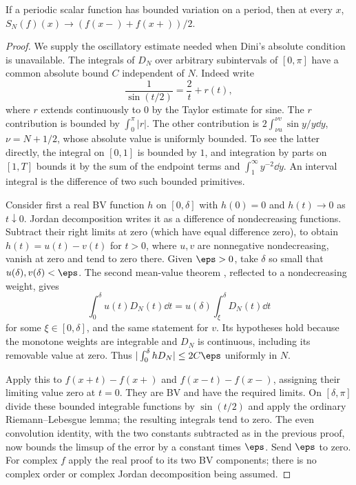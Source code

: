 \begin{theorem}
If a periodic scalar function has bounded variation on a period, then at
every $x$,
$S_N(f)(x)\to(f(x-)+f(x+))/2$.
\end{theorem}
\begin{proof}
We supply the oscillatory estimate needed when Dini's absolute condition
is unavailable. The integrals of $D_N$ over arbitrary subintervals of
$[0,\pi]$ have a common absolute bound $C$ independent of $N$.
Indeed write
\[
 \frac1{\sin(t/2)}=\frac2t+r(t),
\]
where $r$ extends continuously to $0$ by the Taylor estimate for sine.
The $r$ contribution is bounded by $\int_0^\pi|r|$. The other contribution
is $2\int_{\nu u}^{\nu v}\sin y/y\dd y$, $\nu=N+1/2$, whose absolute
value is uniformly bounded. To see the latter directly, the integral on
$[0,1]$ is bounded by $1$, and integration by parts on $[1,T]$ bounds
it by the sum of the endpoint terms and $\int_1^\infty y^{-2}\dd y$.
An interval integral is the difference of two such bounded primitives.

Consider first a real BV function $h$ on $[0,\delta]$ with $h(0)=0$ and
$h(t)\to0$ as $t\downarrow0$. Jordan decomposition writes it as a
difference of nondecreasing functions. Subtract their right limits at zero
(which have equal difference zero), to obtain
$h(t)=u(t)-v(t)$ for $t>0$, where $u,v$ are nonnegative nondecreasing,
vanish at zero and tend to zero there. Given $\eps>0$, take $\delta$ so
small that $u(\delta),v(\delta)<\eps$.
The second mean-value theorem , reflected to a nondecreasing
weight, gives
\[
 \int_0^\delta u(t)D_N(t)\dd t
       =u(\delta)\int_\xi^\delta D_N(t)\dd t
\]
for some $\xi\in[0,\delta]$, and the same statement for $v$.
Its hypotheses hold because the monotone weights are integrable and
$D_N$ is continuous, including its removable value at zero. Thus
$|\int_0^\delta hD_N|\leq2C\eps$ uniformly in $N$.

Apply this to $f(x+t)-f(x+)$ and $f(x-t)-f(x-)$, assigning their limiting
value zero at $t=0$. They are BV and have the required limits. On
$[\delta,\pi]$ divide these bounded integrable functions by $\sin(t/2)$
and apply the ordinary Riemann--Lebesgue lemma; the resulting integrals
tend to zero. The even convolution identity, with the two constants
subtracted as in the previous proof, now bounds the limsup of the error
by a constant times $\eps$. Send $\eps$ to zero. For complex $f$ apply
the real proof to its two BV components; there is no complex order or
complex Jordan decomposition being assumed.
\end{proof}

